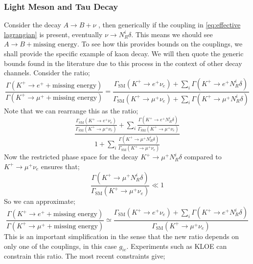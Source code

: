 \documentclass[10pt]{article}
\begin{document}
\subsubsection{Light Meson and Tau Decay}
Consider the decay $A \rightarrow B + \nu$ \cite{Farzan2011, Farzan2014, Farzan2010}, then generically if the coupling in \eqref{eq:effective lagrangian} is present, eventually $\nu \rightarrow N^i_R \delta$. This means we should see $A \rightarrow B + \text{missing energy}$. To see how this provides bounds on the couplings, we shall provide the specific example of kaon decay. We will then quote the generic bounds found in the literature due to this process in the context of other decay channels. Consider the ratio;
\begin{equation}
  \frac{\Gamma(K^+ \rightarrow e^+ + \text{missing energy})}{\Gamma(K^+ \rightarrow \mu^+ + \text{missing energy})} = \frac{\Gamma_{\text{SM}}(K^+ \rightarrow e^+ \nu_e) + \sum_{i}{\Gamma(K^+ \rightarrow e^+ N^i_R \delta)}}{\Gamma_{\text{SM}}(K^+ \rightarrow \mu^+ \nu_e) + \sum_{i}{\Gamma(K^+ \rightarrow \mu^+ N^i_R \delta)}}
\end{equation}
Note that we can rearrange this as the ratio;
\begin{equation}
  \frac{\frac{\Gamma_{\text{SM}}(K^+ \rightarrow e^+ \nu_e)}{\Gamma_{\text{SM}}(K^+ \rightarrow \mu^+ \nu_e)} + \sum_{i}{\frac{\Gamma(K^+ \rightarrow e^+ N^i_R \delta)}{\Gamma_{\text{SM}}(K^+ \rightarrow \mu^+ \nu_e)}}}{1 + \sum_{i}{\frac{\Gamma(K^+ \rightarrow \mu^+ N^i_R \delta)}{\Gamma_{\text{SM}}(K^+ \rightarrow \mu^+ \nu_e)}}}
\end{equation}
Now the restricted phase space for the decay $K^+ \rightarrow \mu^+ N^i_R \delta$ compared to $K^+ \rightarrow \mu^+ \nu_e$ ensures that;
\begin{equation}
  \frac{\Gamma(K^+ \rightarrow \mu^+ N^i_R \delta)}{\Gamma_{\text{SM}}(K^+ \rightarrow \mu^+ \nu_e)} \ll 1
\end{equation}
So we can approximate;
\begin{equation}
  \frac{\Gamma(K^+ \rightarrow e^+ + \text{missing energy})}{\Gamma(K^+ \rightarrow \mu^+ + \text{missing energy})} \simeq \frac{\Gamma_{\text{SM}}(K^+ \rightarrow e^+ \nu_e) + \sum_{i}{\Gamma(K^+ \rightarrow e^+ N^i_R \delta)}}{\Gamma_{\text{SM}}(K^+ \rightarrow \mu^+ \nu_e)}
\end{equation}
This is an important simplification in the sense that the new ratio depends on only one of the couplings, in this case $g_{ie}$. Experiments such as KLOE \cite{Ambrosino2009} can constrain this ratio. The most recent constraints give;
\end{document}
